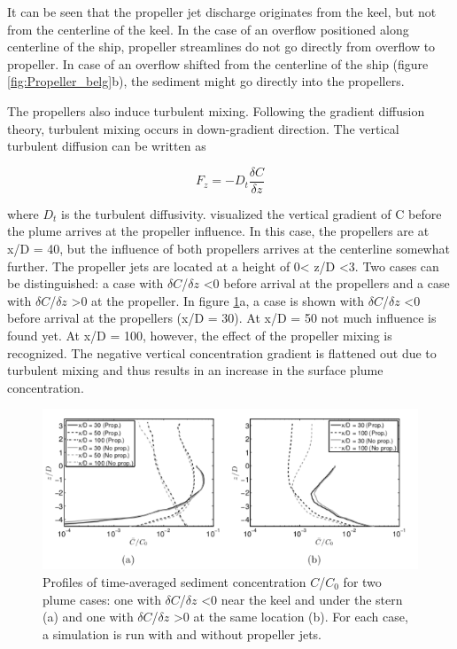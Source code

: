 \noindent It can be seen that the propeller jet discharge originates from the keel, but not from the centerline of the keel. In the case of an overflow positioned along centerline of the ship, propeller streamlines do not go directly from overflow to propeller. In case of an overflow shifted from the centerline of the ship (figure \ref{fig:Propeller_belg}b), the sediment might go directly into the propellers.



\noindent The propellers also induce turbulent mixing. Following the gradient diffusion theory, turbulent mixing occurs in down-gradient direction. The vertical turbulent diffusion can be written as

\begin{equation}
    F_z =  -D_t \frac{\delta C}{\delta z}
    \label{eq:turbulent_diffusion}
\end{equation}

\noindent where $D_t$ is the turbulent diffusivity. \newline \newline \noindent
\cite{Decrop} visualized the vertical gradient of C before the plume arrives at the propeller influence. In this case, the propellers are at x/D = 40, but the influence of both propellers arrives at the centerline somewhat further. The propeller jets are located at a height of 0< z/D <3. Two cases can be distinguished: a case with $\delta C$/$\delta z$ <0 before arrival at the propellers and a case with $\delta C$/$\delta z$ >0 at the propeller. \newline 
\noindent In figure \ref{fig:Propeller_belg_2}a, a case is shown with $\delta C$/$\delta z$ <0 before arrival at the propellers (x/D = 30). At x/D = 50 not much influence is found yet. At x/D = 100, however, the effect of the propeller mixing is recognized. The negative vertical concentration gradient is flattened out due to turbulent mixing and thus results in an increase in the surface plume concentration. \newline 

\begin{figure}[ht!]
    \centering
    \includegraphics[width = 1\textwidth]{Images/Propeller_belg_2.png}
    \caption{Profiles of time-averaged sediment concentration $C$/$C_0$ for two plume cases: one with $\delta C$/$\delta z$ <0 near the keel and under the stern (a) and one with $\delta C$/$\delta z$ >0 at the same location (b). For each case, a simulation is run with and without propeller jets.}
    \label{fig:Propeller_belg_2}
\end{figure}

